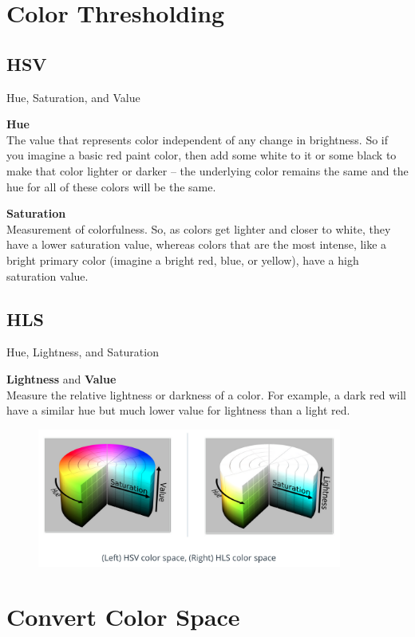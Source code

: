 \documentclass[12pt]{article}
\begin{document}
\section{Color Thresholding}

\subsection{HSV}

Hue, Saturation, and Value

\textbf{Hue}\\
The value that represents color independent of any change in brightness.
So if you imagine a basic red paint color, then add some white to it or some black to make that color lighter or darker -- the underlying color remains the same and the hue for all of these colors will be the same. 

\textbf{Saturation}\\
Measurement of colorfulness. So, as colors get lighter and closer to white, they have a lower saturation value, whereas colors that are the most intense, like a bright primary color (imagine a bright red, blue, or yellow), have a high saturation value.

\subsection{HLS}

Hue, Lightness, and Saturation

\textbf{Lightness} and \textbf{Value}\\
Measure the relative lightness or darkness of a color. For example, a dark red will have a similar hue but much lower value for lightness than a light red.

\begin{figure}[htp]
    \centering
    \includegraphics[width=10cm]{hsv_hls_color_space.png}
    \label{fig:hsv_hls_color_space}
\end{figure}

\section{Convert Color Space}
\end{document}
